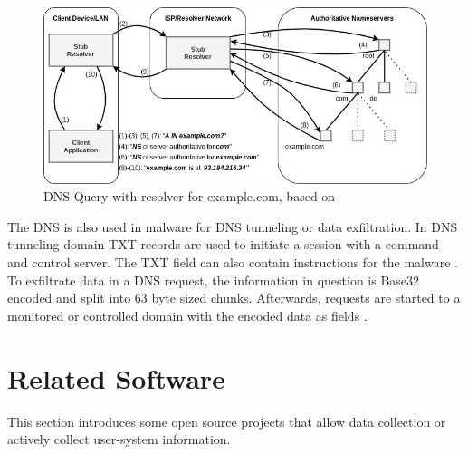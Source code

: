         \begin{figure}
            \centering
            \includegraphics[width=\textwidth]{latex/figures/dns_resolve.jpg}
            \caption[DNS Query with resolver for example.com]{DNS Query with resolver for example.com, based on \cite{friedewald_privacy_2018}}
            \label{fig:dns_query}
        \end{figure}
        
        
        The DNS is also used in malware for DNS tunneling or data exfiltration.
        In DNS tunneling domain TXT records are used to initiate a session with a command and control server. The TXT field can also contain instructions for the malware \cite{das_detection_2017}.\\
        To exfiltrate data in a DNS request, the information in question is Base32 encoded and split into 63 byte sized chunks. Afterwards, requests are started to a monitored or controlled domain with the encoded data as fields \cite{mertens_infosec_2017}.\\
        
\newpage
\section{Related Software}
    \label{sec:related:related_sw}
    This section introduces some open source projects that allow data collection or actively collect user-system information. 
    
